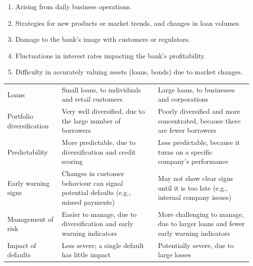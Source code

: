 \begin{enumerate}[label=\alph*)]
\item {} Arising from daily business operations.
\item {} Strategies for new products or market trends, and
changes in loan volumes.
\item {} Damage to the bank's image with customers or
regulators.
\item {} Fluctuations in interest rates impacting the
bank's profitability.
\item {} Difficulty in accurately valuing assets (loans,
bonds) due to market changes.
\end{enumerate}


\begin{center}
\footnotesize
\begin{tabular}{L{2.9cm} L{5.6cm} L{6.0cm}}
\toprule
 &  &  \\
\midrule
Loans & Small loans, to individuals and retail customers &
  Large loans, to businesses and corporations \\
Portfolio diversification & Very well diversified, due to the large number of
  borrowers &
  Poorly diversified and more concentrated, because there are fewer borrowers \\
Predictability & More predictable, due to diversification and credit scoring &
  Less predictable, because it turns on a specific company's performance \\
Early warning signs & Changes in customer behaviour can signal potential defaults
  (e.g., missed payments) &
  May not show clear signs until it is too late (e.g., internal company issues) \\
Management of risk & Easier to manage, due to diversification and early warning
  indicators &
  More challenging to manage, due to larger loans and fewer early warning
  indicators \\
Impact of defaults & Less severe; a single default has little impact &
  Potentially severe, due to large losses \\
\bottomrule
\end{tabular}
\end{center}


